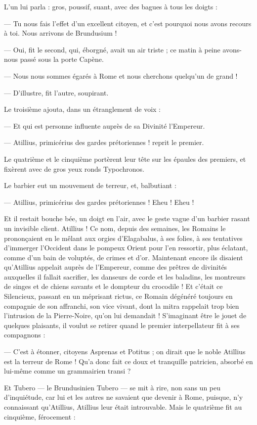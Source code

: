 \documentclass[a4paper, 11pt, oneside, polutonikogreek, french]{article}
\begin{document}
L'un lui parla : gros, poussif, suant, avec des bagues à tous les doigts :

--- Tu nous fais l'effet d'un excellent citoyen, et c'est pourquoi nous avons recours à toi. Nous arrivons de Brundusium !

--- Oui, fit le second, qui, éborgné, avait un air triste ; ce matin à peine avons-nous passé sous la porte Capène.

--- Nous nous sommes égarés à Rome et nous cherchons quelqu'un de grand !

--- D'illustre, fit l'autre, soupirant.

Le troisième ajouta, dans un étranglement de voix :

--- Et qui est personne influente auprès de sa Divinité l'Empereur.

--- Atillius, primicérius des gardes prétoriennes ! reprit le premier.

Le quatrième et le cinquième portèrent leur tête sur les épaules des premiers, et fixèrent avec de gros yeux ronds Typochronos.

Le barbier eut un mouvement de terreur, et, balbutiant :

--- Atillius, primicérius des gardes prétoriennes ! Eheu ! Eheu !

Et il restait bouche bée, un doigt en l'air, avec le geste vague d'un barbier rasant un invisible client. Atillius ! Ce nom, depuis des semaines, les Romains le prononçaient en le mêlant aux orgies d'Elagabalus, à ses folies, à ses tentatives d'immerger l'Occident dans le pompeux Orient pour l'en ressortir, plus éclatant, comme d'un bain de voluptés, de crimes et d'or. Maintenant encore ils disaient qu'Atillius appelait auprès de l'Empereur, comme des prêtres de divinités auxquelles il fallait sacrifier, les danseurs de corde et les baladins, les montreurs de singes et de chiens savants et le dompteur du crocodile ! Et c'était ce Silencieux, passant en un méprisant rictus, ce Romain dégénéré toujours en compagnie de son affranchi, son vice vivant, dont la mitra rappelait trop bien l'intrusion de la Pierre-Noire, qu'on lui demandait ! S'imaginant être le jouet de quelques plaisants, il voulut se retirer quand le premier interpellateur fit à ses compagnons :

--- C'est à étonner, citoyens Asprenas et Potitus ; on dirait que le noble Atillius est la terreur de Rome ! Qu'a donc fait ce doux et tranquille patricien, absorbé en lui-même comme un grammairien transi ?

Et Tubero --- le Brundusinien Tubero --- se mit à rire, non sans un peu d'inquiétude, car lui et les autres ne savaient que devenir à Rome, puisque, n'y connaissant qu'Atillius, Atillius leur était introuvable. Mais le quatrième fit au cinquième, férocement :
\end{document}
